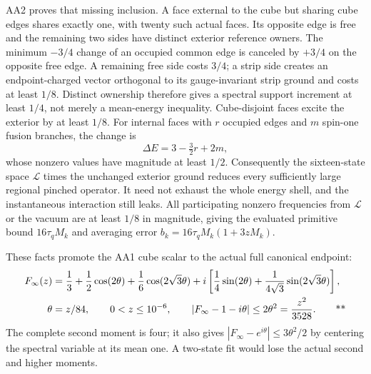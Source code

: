 AA2 proves that missing inclusion.  A face external to the cube but sharing
cube edges shares exactly one, with twenty such actual faces.  Its opposite
edge is free and the remaining two sides have distinct exterior reference
owners.  The minimum $-3/4$ change of an occupied common edge is canceled by
$+3/4$ on the opposite free edge.  A remaining free side costs $3/4$; a strip
side creates an endpoint-charged vector orthogonal to its gauge-invariant
strip ground and costs at least $1/8$.  Distinct ownership therefore gives a
spectral support increment at least $1/4$, not merely a mean-energy inequality.
Cube-disjoint faces excite the exterior by at least $1/8$.  For internal faces
with $r$ occupied edges and $m$ spin-one fusion branches, the change is
\begin{equation}
 \Delta E=3-\tfrac32r+2m,
 \label{recent:aa-selection}
\end{equation}
whose nonzero values have magnitude at least $1/2$.
Consequently the sixteen-state space $\mathcal L$ times the unchanged exterior
ground reduces every sufficiently large regional pinched operator.  It need
not exhaust the whole energy shell, and the instantaneous interaction still
leaks.  All participating nonzero frequencies from $\mathcal L$ or the vacuum
are at least $1/8$ in magnitude, giving the evaluated primitive bound
$16\tau_qM_k$ and averaging error
$b_k=16\tau_qM_k(1+3zM_k)$.

These facts promote the AA1 cube scalar to the actual full canonical endpoint:
\begin{align}
 F_\infty(z)&=\frac13+\frac12\cos(2\theta)
 +\frac16\cos(2\sqrt3\theta)
 +i\left[\frac14\sin(2\theta)
 +\frac1{4\sqrt3}\sin(2\sqrt3\theta)\right],\notag\\
 \theta&=z/84,\qquad0<z\le10^{-6},\qquad
 |F_\infty-1-i\theta|\le2\theta^2=\frac{z^2}{3528}.
 \qquad\text{**}
 \label{recent:aa-endpoint}
\end{align}
The complete second moment is four; it also gives
$|F_\infty-e^{i\theta}|\le3\theta^2/2$ by centering the spectral variable at
its mean one.  A two-state fit would lose the actual second and higher moments.

